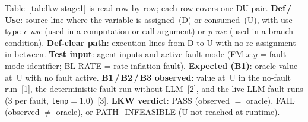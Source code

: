 \documentclass[sigconf,review,anonymous,balance=false]{acmart}
\begin{document}
Table~\ref{tab:lkw-stage1} is read row-by-row; each row covers one DU pair.
\textbf{Def\,/\,Use}: source line where the variable is assigned~(D) or consumed~(U),
with use type \emph{c-use} (used in a computation or call argument) or
\emph{p-use} (used in a branch condition).
\textbf{Def-clear path}: execution lines from D to U with no re-assignment in between.
\textbf{Test input}: agent inputs and active fault mode
(FM-$x$.$y$ = fault mode identifier; BL-RATE = rate inflation fault).
\textbf{Expected (B1)}: oracle value at~U with no fault active.
\textbf{B1\,/\,B2\,/\,B3 observed}: value at~U in the no-fault run~[1],
the deterministic fault run without LLM~[2], and the live-LLM fault
runs (3 per fault, \texttt{temp}$=1.0$)~[3].
\textbf{LKW verdict}: PASS (observed $=$ oracle), FAIL (observed $\neq$ oracle),
or PATH\_INFEASIBLE (U not reached at runtime).
\end{document}
